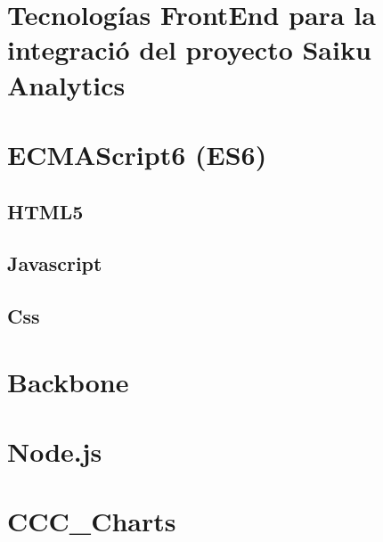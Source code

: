 \section{Tecnolog\'{i}as FrontEnd para la integraci\'{o} del proyecto Saiku Analytics}
	\section{ECMAScript6 (ES6)}
	\subsection{HTML5}
	\subsection{Javascript}
	\subsection{Css}
	\section{Backbone}
	\section{Node.js}
	\section{CCC_Charts}

		
		
		
		
